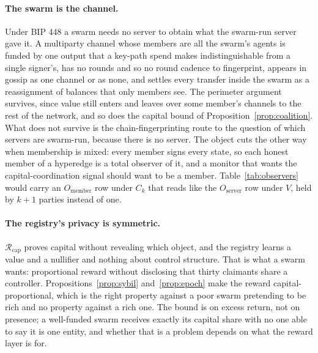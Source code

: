 \documentclass[11pt]{article}
\theoremstyle{plain}
\theoremstyle{definition}
\theoremstyle{remark}
\newcommand{\Rcap}{\mathcal{R}_{\mathrm{cap}}}
\begin{document}
\paragraph{The swarm is the channel.} Under BIP 448 a swarm needs no server to obtain what the swarm-run server gave it. A multiparty channel whose members are all the swarm's agents is funded by one output that a key-path spend makes indistinguishable from a single signer's, has no rounds and so no round cadence to fingerprint, appears in gossip as one channel or as none, and settles every transfer inside the swarm as a reassignment of balances that only members see. The perimeter argument survives, since value still enters and leaves over some member's channels to the rest of the network, and so does the capital bound of Proposition~\ref{prop:coalition}. What does not survive is the chain-fingerprinting route to the question of which servers are swarm-run, because there is no server. The object cuts the other way when membership is mixed: every member signs every state, so each honest member of a hyperedge is a total observer of it, and a monitor that wants the capital-coordination signal should want to be a member. Table~\ref{tab:observers} would carry an $O_{\mathrm{member}}$ row under $C_k$ that reads like the $O_{\mathrm{server}}$ row under $V$, held by $k+1$ parties instead of one.

\paragraph{The registry's privacy is symmetric.} $\Rcap$ proves capital without revealing which object, and the registry learns a value and a nullifier and nothing about control structure. That is what a swarm wants: proportional reward without disclosing that thirty claimants share a controller. Propositions~\ref{prop:sybil} and~\ref{prop:epoch} make the reward capital-proportional, which is the right property against a poor swarm pretending to be rich and no property against a rich one. The bound is on excess return, not on presence; a well-funded swarm receives exactly its capital share with no one able to say it is one entity, and whether that is a problem depends on what the reward layer is for.
\end{document}
